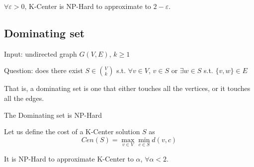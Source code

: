     \begin{theorem}
        $\forall \varepsilon > 0$, K-Center is NP-Hard to approximate to $2 - \varepsilon$.
    \end{theorem}


\subsection{Dominating set}
    Input: undirected graph $G(V,E)$, $k \geq 1$

    Question: does there exist $S \in \binom{V}{k}$ s.t. $\forall v \in V$, $v \in S$ or $\exists w \in S$ s.t. $\{ v,w \} \in E$

    That is, a dominating set is one that either touches all the vertices, or it touches all the edges.

    \begin{theorem}
        The Dominating set is NP-Hard
    \end{theorem}

    Let us define the cost of a K-Center solution $S$ as
    \[ Cen(S) = \max_{v \in V} \min_{c \in S} d(v,c) \]

    \begin{theorem}
        It is NP-Hard to approximate K-Center to $\alpha$, $\forall \alpha < 2$.
    \end{theorem}

